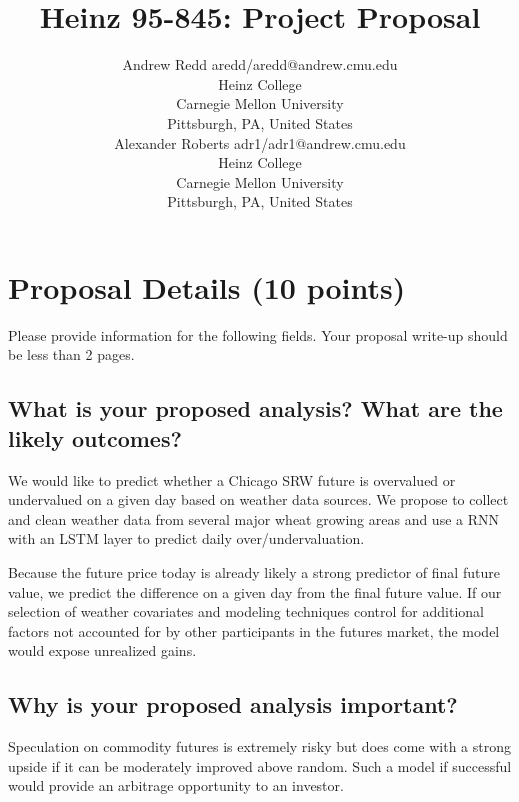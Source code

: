 \documentclass[twoside,11pt]{article}
\begin{document}
\title{Heinz 95-845: Project Proposal}

\author{\name Andrew Redd \email aredd/aredd@andrew.cmu.edu \\
       \addr Heinz College\\
       Carnegie Mellon University\\
       Pittsburgh, PA, United States \\
       \AND
       \name Alexander Roberts \email adr1/adr1@andrew.cmu.edu \\
       \addr Heinz College\\
       Carnegie Mellon University\\
       Pittsburgh, PA, United States}
\maketitle

\section{Proposal Details (10 points)} \label{details}
Please provide information for the following fields. Your proposal write-up should be less than 2 pages.

\subsection{What is your proposed analysis? What are the likely outcomes?}

We would like to predict whether a Chicago SRW future is overvalued or undervalued on a given day based on weather data sources. We propose to collect and clean weather data from several major wheat growing areas and use a RNN with an LSTM layer to predict daily over/undervaluation. 

Because the future price today is already likely a strong predictor of final future value, we predict the difference on a given day from the final future value. If our selection of weather covariates and modeling techniques control for additional factors not accounted for by other participants in the futures market, the model would expose unrealized gains.  

\subsection{Why is your proposed analysis important?}

Speculation on commodity futures is extremely risky but does come with a strong upside if it can be moderately improved above random. Such a model if successful would provide an arbitrage opportunity to an investor. 
\end{document}
